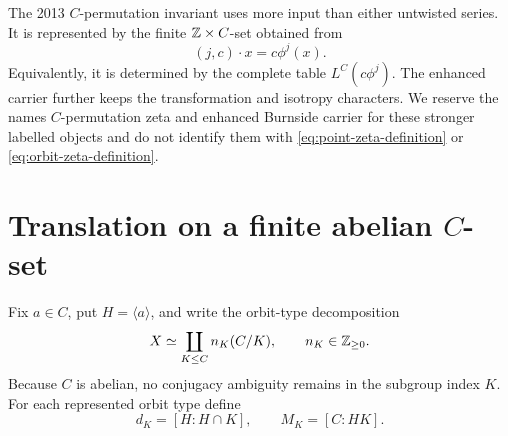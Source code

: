 \documentclass[11pt]{article}
\theoremstyle{definition}
\theoremstyle{remark}
\begin{document}
The 2013 \(C\)-permutation invariant uses more input than either untwisted
series.  It is represented by the finite \(\mathbb{Z}\times C\)-set obtained from
\begin{equation}
  (j,c)\cdot x=c\phi^j(x).
  \label{eq:z-times-c-action}
\end{equation}
Equivalently, it is determined by the complete table \(L^C(c\phi^j)\).
The enhanced carrier further keeps the transformation and isotropy
characters.  We reserve the names \(C\)-permutation zeta and enhanced
Burnside carrier for these stronger labelled objects and do not identify
them with \eqref{eq:point-zeta-definition} or
\eqref{eq:orbit-zeta-definition}.

\section{Translation on a finite abelian \texorpdfstring{\(C\)}{C}-set}
\label{sec:general}

Fix \(a\in C\), put \(H=\langle a\rangle\), and write the orbit-type
decomposition
\begin{equation}
  X\simeq\coprod_{K\le C} n_K(C/K),
  \qquad n_K\in\mathbb{Z}_{\ge0}.
  \label{eq:orbit-decomposition}
\end{equation}
Because \(C\) is abelian, no conjugacy ambiguity remains in the subgroup
index \(K\).  For each represented orbit type define
\begin{equation}
  d_K=[H:H\cap K],
  \qquad
  M_K=[C:HK].
  \label{eq:d-m-definitions}
\end{equation}
\end{document}
